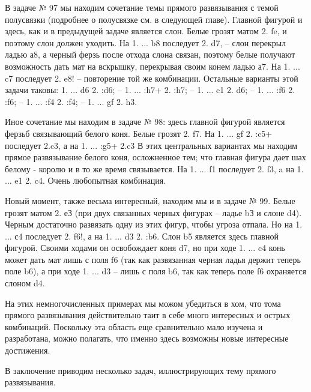 В задаче № 97 мы находим сочетание темы прямого развязывания с темой полусвязки (подробнее о полусвязке см. в следующей главе). Главной фигурой и здесь, как и в предыдущей задаче является слон. Белые грозят матом 2. fe\mate{}, и поэтому слон должен уходить. На 1. ... \bishop{}b8 последует 2. \knight{}d7\mate{}, -- слон перекрыл ладью а8, а черный ферзь после отхода слона связан, поэтому белые получают возможность дать мат на вскрышку, перекрывая своим конем ладью а7. На 1. ... \bishop{}c7 последует 2. \knight{}e8\mate{}! -- повторение той же комбинации. Остальные варианты этой задачи таковы: 1. ... \bishop{}d6 2. \knight{}:d6\mate{}; -- 1. ... \rook{}:h7+ 2. \bishop{}:h7\mate{}; -- 1. ... \queen{}c1 2. \knight{}d6\mate{}; -- 1. ... \bishop{}:f6 2. \rook{}:f6\mate{}; -- 1. ... \bishop{}:f4 2. \queen{}:f4\mate{}; -- 1. ... gf 2. \queen{}h3\mate{}.

Иное сочетание мы находим в задаче № 98: здесь главной фигурой является ферзьб связывающий белого коня. Белые грозят 2. \queen{}f7\mate{}. На 1. ... gf 2. \queen{}:c5+ последует 2.\knight{}c3\mate{}, а на 1. ... \queen{}:g5+ 2.\king{}c3\mate{} В этих центральных вариантах мы находим прямое развязывание белого коня, осложненное тем; что главная фигура дает шах белому - королю и в то же время связывается. На 1. ... \queen{}f1 последует 2. \knight{}f3\mate{}, a на 1. ... \queen{}e1 2. \knight{}c4\mate{}. Очень любопытная комбинация.

Новый момент, также весьма интересный, находим мы и в задаче № 99. Белые грозят матом 2. \knight{}еЗ\mate{} (при двух связанных черных фигурах -- ладье bЗ и слоне d4). Черным достаточно развязать одну из этих фигур, чтобы угроза отпала. Но на 1. ... \bishop{}с4 последует 2. \knight{}f6\mate{}!, а на 1. ... \bishop{}d3 2. \knight{}:b6\mate{}. Слон b5 является здесь главной фигурой. Своими ходами он освобождает коня d7, но при ходе 1. ... \bishop{}c4 конь может дать мат лишь с поля f6 (так как развязанная черная ладья держит теперь поле b6), а при ходе 1. ... \bishop{}d3 -- лишь с поля b6, так как теперь поле f6 охраняется слоном d4.

На этих немногочисленных примерах мы можом убедиться в хом, что тома прямого развязывания действительно таит в себе много интересных и острых комбинаций. Поскольку эта область еще сравнительно мало изучена и разработана, можно полагать, что именно здесь возможны новые интересные достижения.

В заключение приводим несколько задач, иллюстрирующих тему прямого развязывания.
 
